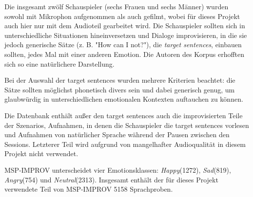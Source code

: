 \documentclass{article} %
\begin{document}
Die insgesamt zwölf Schauspieler (sechs Frauen und sechs Männer) wurden sowohl mit Mikrophon aufgenommen als auch gefilmt, wobei für dieses Projekt auch hier nur mit dem Audioteil gearbeitet wird. Die Schauspieler sollten sich in unterschiedliche Situationen hineinversetzen und Dialoge improvisieren, in die sie jedoch generische Sätze (z. B. "How can I not?"), die \emph{target sentences}, einbauen sollten, jedes Mal mit einer anderen Emotion. Die Autoren des Korpus erhofften sich so eine natürlichere Darstellung. 

Bei der Auswahl der target sentences wurden mehrere Kriterien beachtet: die Sätze sollten möglichst phonetisch divers sein und dabei generisch genug, um glaubwürdig in unterschiedlichen emotionalen Kontexten auftauchen zu können. 

Die Datenbank enthält außer den target sentences auch die improvisierten Teile der Szenarios, Aufnahmen, in denen die Schauspieler die target sentences vorlesen und Aufnahmen von natürlicher Sprache während der Pausen zwischen den Sessions. Letzterer Teil wird aufgrund von mangelhafter Audioqualität in diesem Projekt nicht verwendet. 

MSP-IMPROV unterscheidet vier Emotionsklassen: \emph{Happy}(1272), \emph{Sad}(819), \emph{Angry}(754) und \emph{Neutral}(2313). Insgesamt enthält der für dieses Projekt verwendete Teil von MSP-IMPROV 5158 Sprachproben. 
\end{document}
